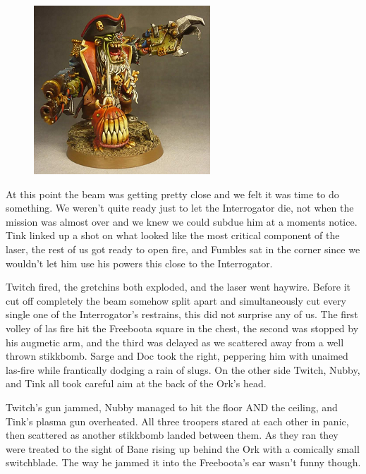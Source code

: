 \begin{figure}
	\begin{center}
		\includegraphics[width=\figwidth]{pics/9/55.png}
	\end{center}
\end{figure}
At this point the beam was getting pretty close and we felt it was time to do something. 
We weren't quite ready just to let the Interrogator die, not when the mission was almost over and we knew we could subdue him at a moments notice. 
Tink linked up a shot on what looked like the most critical component of the laser, the rest of us got ready to open fire, and Fumbles sat in the corner since we wouldn't let him use his powers this close to the Interrogator.

Twitch fired, the gretchins both exploded, and the laser went haywire. 
Before it cut off completely the beam somehow split apart and simultaneously cut every single one of the Interrogator's restrains, this did not surprise any of us. 
The first volley of las fire hit the Freeboota square in the chest, the second was stopped by his augmetic arm, and the third was delayed as we scattered away from a well thrown stikkbomb. 
Sarge and Doc took the right, peppering him with unaimed las-fire while frantically dodging a rain of slugs. 
On the other side Twitch, Nubby, and Tink all took careful aim at the back of the Ork's head.

Twitch's gun jammed, Nubby managed to hit the floor AND the ceiling, and Tink's plasma gun overheated. 
All three troopers stared at each other in panic, then scattered as another stikkbomb landed between them. 
As they ran they were treated to the sight of Bane rising up behind the Ork with a comically small switchblade. 
The way he jammed it into the Freeboota's ear wasn't funny though.

